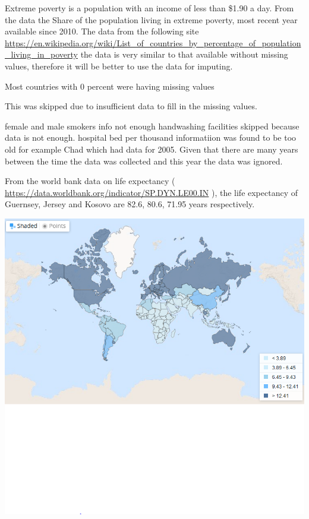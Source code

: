 \documentclass[
]{article}
\begin{document}
Extreme poverty is a population with an income of less than \$1.90 a day. From the data the Share of the population living in extreme poverty, most recent year available since 2010. The data from the following site \url{https://en.wikipedia.org/wiki/List_of_countries_by_percentage_of_population_living_in_poverty} the data is very similar to that available without missing values, therefore it will be better to use the data for imputing.

Most countries with 0 percent were having missing values

This was skipped due to insufficient data to fill in the missing values.

female and male smokers info not enough
handwashing facilities skipped because data is not enough.
hospital bed per thousand informatiion was found to be too old for example Chad which had data for 2005. Given that there are many years between the time the data was collected and this year the data was ignored.

From the world bank data on life expectancy ( \url{https://data.worldbank.org/indicator/SP.DYN.LE00.IN} ), the life expectancy of Guernsey, Jersey and Kosovo are 82.6, 80.6, 71.95 years respectively.

\begin{center}\includegraphics[width=1\linewidth,height=1\textheight]{Capture} \end{center}
\end{document}
